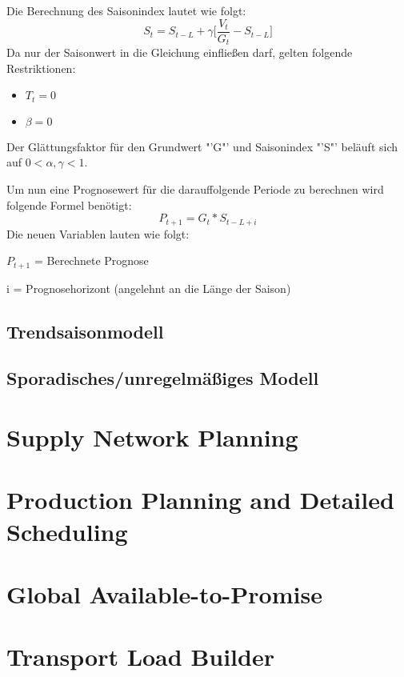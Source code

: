 Die Berechnung des Saisonindex lautet wie folgt:
\begin{equation}
	S_{t} = S_{t-L} + \gamma \big[\dfrac{V_{t}}{G_{t}} - S_{t-L} \big]
\end{equation}
Da nur der Saisonwert in die Gleichung einfließen darf, gelten folgende Restriktionen:
\begin{itemize}
	\item $T_{t} = 0$
	\item $\beta = 0$	
\end{itemize}
Der Glättungsfaktor für den Grundwert "'G"' und Saisonindex "'S"' beläuft sich auf $0 < \alpha, \gamma < 1$.

Um nun eine Prognosewert für die darauffolgende Periode zu berechnen wird folgende Formel benötigt:
\begin{equation}
	P_{t+1} = G_{t} * S_{t-L+i}
\end{equation}
Die neuen Variablen lauten wie folgt:
\begin{itemmize}
	\item $P_{t+1}$ = Berechnete Prognose
	\item i = Prognosehorizont (angelehnt an die Länge der Saison)
\end{itemmize}

\subsection{Trendsaisonmodell}
\subsection{Sporadisches/unregelmäßiges Modell}

\section{Supply Network Planning}
\cite[S.~169~ff]{Witt:2014:GrundkursSAPAPO}
\section{Production Planning and Detailed Scheduling}
\section{Global Available-to-Promise}
\section{Transport Load Builder}
